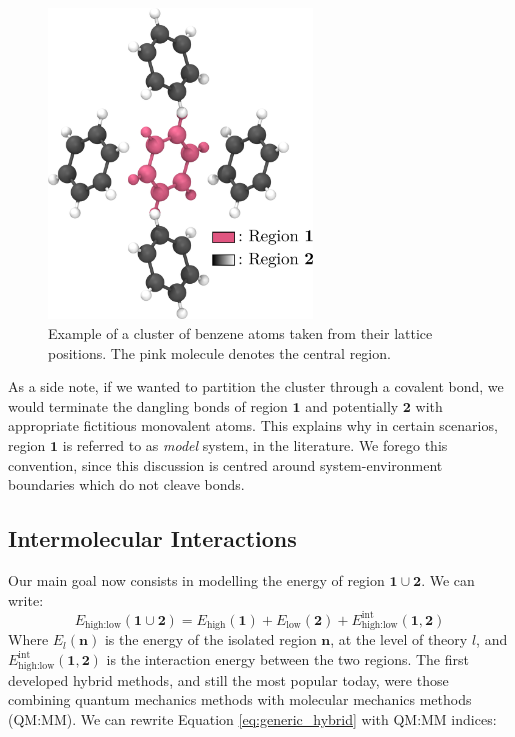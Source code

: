 \begin{figure}
\centering
\includegraphics[width=7cm]{Chapters/3Embedding/benz_example_cluster.pdf}
\caption{Example of a cluster of benzene atoms taken from their lattice positions. The pink molecule denotes the central region.}
\label{fig:benz_clu}
\end{figure}

As a side note, if we wanted to partition the cluster through a covalent bond, we would terminate the dangling bonds of region $\bm{1}$ and potentially $\bm{2}$ with appropriate fictitious monovalent atoms. This explains why in certain scenarios, region $\bm{1}$ is referred to as \textit{model} system, in the literature. We forego this convention, since this discussion is centred around system-environment boundaries which do not cleave bonds.

\subsection{Intermolecular Interactions}
Our main goal now consists in modelling the energy of region $\bm{1} \cup \bm{2}$. We can write:
\begin{equation}
    E_{\text{high}:\text{low}}(\bm{1} \cup \bm{2}) = E_{\text{high}}(\bm{1}) + E_{\text{low}}(\bm{2}) + E^{\text{int}}_{\text{high}:\text{low}}(\bm{1},\bm{2})
    \label{eq:generic_hybrid}
\end{equation}
Where $E_{l}(\bm{n})$ is the energy of the isolated region $\bm{n}$, at the level of theory $l$, and $E^{\text{int}}_{\text{high}:\text{low}}(\bm{1},\bm{2})$ is the interaction energy between the two regions. The first developed hybrid methods, and still the most popular today, were those combining quantum mechanics methods with molecular mechanics methods (QM:MM). We can rewrite Equation \ref{eq:generic_hybrid} with QM:MM indices:\cite{Warshel1976}

